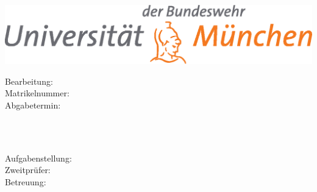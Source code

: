 \begin{titlepage}
\begin{center}

\includegraphics[width=0.8\columnwidth]{figures/unibw}

\vspace{2cm}

{\Huge \bfseries \ttitle\par}\vspace{2cm} %

{\Large \ttype\par}

\vfill

\begin{minipage}[t]{0.4\columnwidth}
    \begin{flushleft}
        Bearbeitung:\\
        Matrikelnummer:\\
        Abgabetermin:\\
    \end{flushleft}
\end{minipage}
\begin{minipage}[t]{0.4\columnwidth}
    \begin{flushleft}
        \authorname\\
        \matnumber\\
        \hdate
    \end{flushleft}
\end{minipage}\par
\vspace{1.5cm}
\begin{minipage}[t]{0.4\columnwidth}
    \begin{flushleft}
        Aufgabenstellung:\\
        Zweitpr\"ufer:\\
        Betreuung:\\
    \end{flushleft}
\end{minipage}
\begin{minipage}[t]{0.4\columnwidth}
    \begin{flushleft}
        \fxname\\
        \sxname\\
        \supname
    \end{flushleft}
\end{minipage}\par

\vfill

{\large \univname\\\deptname}

\end{center}
\end{titlepage}
